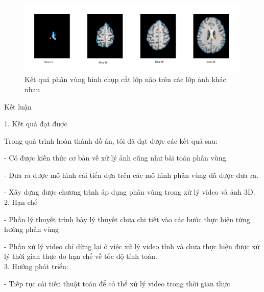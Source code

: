 \documentclass[12pt, oneside, a4]{book}
\begin{document}
\begin{center}
\begin{figure}
\includegraphics[scale=0.5]{figure/brainslice1.png}
\caption{Kết quả phân vùng hình chụp cắt lớp não trên các lớp ảnh khác nhau}
\end{figure}
\end{center}
\newpage
\begin{center}
\begin{huge}
Kết luận
\end{huge}
\end{center}
1. Kết quả đạt được

Trong quá trình hoàn thành đồ án, tôi đã đạt được các kết quả sau:

- Có được kiến thức cơ bản về xử lý ảnh cũng như bài toán phân vùng.

- Đưa ra được mô hình cải tiến dựa trên các mô hình phân vùng đã được đưa ra.

- Xây dựng được chương trình áp dụng phân vùng trong xử lý video và ảnh 3D.\\
2. Hạn chế

- Phần lý thuyết trình bày lý thuyết chưa chi tiết vào các bước thực hiện từng hướng phân vùng

- Phần xử lý video chỉ dừng lại ở việc xử lý video tĩnh và chưa thực hiện được xử lý thời gian thực do hạn chế về tốc độ tính toán.\\
3. Hướng phát triển:

- Tiếp tục cải tiến thuật toán để có thể xử lý video trong thời gian thực
\end{document}
